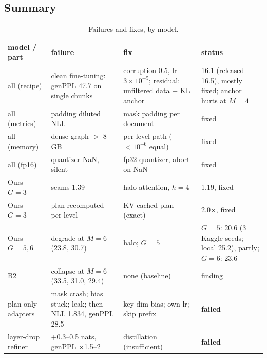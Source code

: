 \subsection{Summary}
\begin{table}[!ht]
\centering
\small
\caption{Failures and fixes, by model.}
\begin{tabular}{p{2.6cm}p{4.2cm}p{4.2cm}p{2.2cm}}
\toprule
model / part & failure & fix & status \\
\midrule
all (recipe) & clean fine-tuning: genPPL 47.7 on single chunks & corruption 0.5, lr $3{\times}10^{-5}$; residual: unfiltered data + KL anchor & 16.1 (released 16.5), mostly fixed; anchor hurts at $M{=}4$ \\
all (metrics) & padding diluted NLL & mask padding per document & fixed \\
all (memory) & dense graph $>$ 8\,GB & per-level path ($<10^{-6}$ equal) & fixed \\
all (fp16) & quantizer NaN, silent & fp32 quantizer, abort on NaN & fixed \\
Ours $G{=}3$ & seams 1.39 & halo attention, $h{=}4$ & 1.19, fixed \\
Ours $G{=}3$ & plan recomputed per level & KV-cached plan (exact) & 2.0$\times$, fixed \\
Ours $G{=}5,6$ & degrade at $M{=}6$ (23.8, 30.7) & halo; $G{=}5$ & $G{=}5$: 20.6 (3 Kaggle seeds; local 25.2), partly; $G{=}6$: 23.6 \\
B2 & collapse at $M{=}6$ (33.5, 31.0, 29.4) & none (baseline) & finding \\
plan-only adapters & mask crash; bias stuck; leak; then NLL 1.834, genPPL 28.5 & key-dim bias; own lr; skip prefix & \textbf{failed} \\
layer-drop refiner & +0.3--0.5 nats, genPPL $\times$1.5--2 & distillation (insufficient) & \textbf{failed} \\
\bottomrule
\end{tabular}
\end{table}
